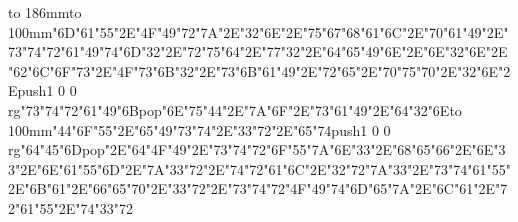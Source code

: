 \hbox to 186mm{\hsize=81mm\vbox to 100mm{\vfill\ipa\char"6D\ipa\char"61\ipa\char"55\ipa\char"2E\ipa\char"4F\ipa\char"49\ipa\char"72\ipa\char"7A\ipa\char"2E\ipa\char"32\ipa\char"6E\ipa\char"2E\ipa\char"75\ipa\char"67\medskip\ipa\char"68\ipa\char"61\ipa\char"6C\ipa\char"2E\ipa\char"70\ipa\char"61\ipa\char"49\ipa\char"2E\ipa\char"73\ipa\char"74\ipa\char"72\ipa\char"61\ipa\char"49\ipa\char"74\medskip\ipa\char"6D\ipa\char"32\ipa\char"2E\ipa\char"72\ipa\char"75\ipa\char"64\ipa\char"2E\ipa\char"77\ipa\char"32\ipa\char"2E\ipa\char"64\ipa\char"65\ipa\char"49\ipa\char"6E\ipa\char"2E\ipa\char"6E\ipa\char"32\ipa\char"6E\ipa\char"2E\ipa\char"62\ipa\char"6C\ipa\char"6F\ipa\char"73\ipa\char"2E\ipa\char"4F\ipa\char"73\ipa\char"6B\medskip\ipa\char"32\ipa\char"2E\ipa\char"73\ipa\char"6B\ipa\char"61\ipa\char"49\ipa\char"2E\ipa\char"72\ipa\char"65\ipa\char"2E\ipa\char"70\ipa\char"75\ipa\char"70\ipa\char"2E\ipa\char"32\ipa\char"6E\ipa\char"2E\pdfcolorstack\match push{1 0 0 rg}\ipa\char"73\ipa\char"74\ipa\char"72\ipa\char"61\ipa\char"49\ipa\char"6B\pdfcolorstack\match pop{}\medskip\ipa\char"6E\ipa\char"75\ipa\char"44\ipa\char"2E\ipa\char"7A\ipa\char"6F\ipa\char"2E\ipa\char"73\ipa\char"61\ipa\char"49\ipa\char"2E\ipa\char"64\ipa\char"32\ipa\char"6E\vfill}\hfill\vbox to 100mm{\vfill\ipa\char"44\ipa\char"6F\ipa\char"55\ipa\char"2E\ipa\char"65\ipa\char"49\ipa\char"73\ipa\char"74\ipa\char"2E\ipa\char"33\ipa\char"72\ipa\char"2E\ipa\char"65\ipa\char"74\medskip\pdfcolorstack\match push{1 0 0 rg}\ipa\char"64\ipa\char"45\ipa\char"6D\pdfcolorstack\match pop{}\ipa\char"2E\ipa\char"64\ipa\char"4F\ipa\char"49\ipa\char"2E\ipa\char"73\ipa\char"74\ipa\char"72\ipa\char"6F\ipa\char"55\ipa\char"7A\medskip\ipa\char"6E\ipa\char"33\ipa\char"2E\ipa\char"68\ipa\char"65\ipa\char"66\ipa\char"2E\ipa\char"6E\ipa\char"33\ipa\char"2E\ipa\char"6E\ipa\char"61\ipa\char"55\ipa\char"6D\ipa\char"2E\ipa\char"7A\ipa\char"33\ipa\char"72\ipa\char"2E\ipa\char"74\ipa\char"72\ipa\char"61\ipa\char"6C\ipa\char"2E\ipa\char"32\ipa\char"72\ipa\char"7A\medskip\ipa\char"33\ipa\char"2E\ipa\char"73\ipa\char"74\ipa\char"61\ipa\char"55\ipa\char"2E\ipa\char"6B\ipa\char"61\ipa\char"2E\ipa\char"66\ipa\char"65\ipa\char"70\ipa\char"2E\ipa\char"33\ipa\char"72\ipa\char"2E\ipa\char"73\ipa\char"74\ipa\char"72\ipa\char"4F\ipa\char"49\ipa\char"74\medskip\ipa\char"6D\ipa\char"65\ipa\char"7A\ipa\char"2E\ipa\char"6C\ipa\char"61\ipa\char"2E\ipa\char"72\ipa\char"61\ipa\char"55\ipa\char"2E\ipa\char"74\ipa\char"33\ipa\char"72\vfill}}\eject
